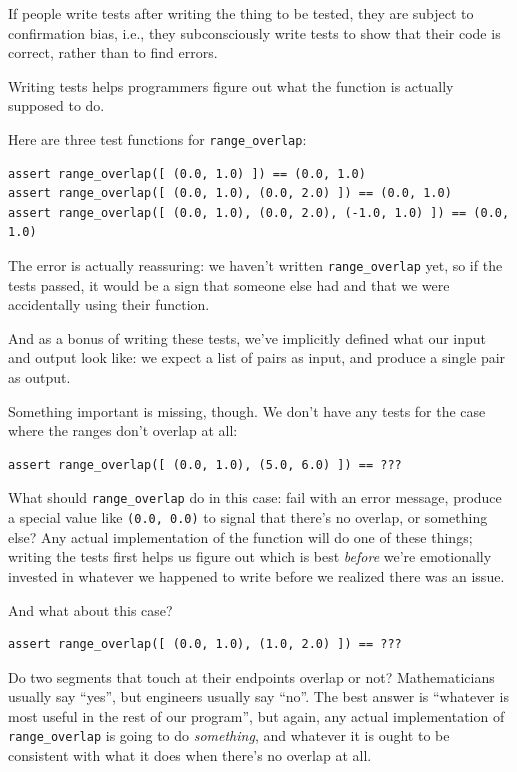 \documentclass{book}
\begin{document}
\begin{swcenumerate}
\item
  If people write tests after writing the thing to be tested, they are
  subject to confirmation bias, i.e., they subconsciously write tests to
  show that their code is correct, rather than to find errors.
\item
  Writing tests helps programmers figure out what the function is
  actually supposed to do.
\end{swcenumerate}

Here are three test functions for \texttt{range\_overlap}:

\begin{verbatim}
assert range_overlap([ (0.0, 1.0) ]) == (0.0, 1.0)
assert range_overlap([ (0.0, 1.0), (0.0, 2.0) ]) == (0.0, 1.0)
assert range_overlap([ (0.0, 1.0), (0.0, 2.0), (-1.0, 1.0) ]) == (0.0, 1.0)
\end{verbatim}

The error is actually reassuring: we haven't written
\texttt{range\_overlap} yet, so if the tests passed, it would be a sign
that someone else had and that we were accidentally using their
function.

And as a bonus of writing these tests, we've implicitly defined what our
input and output look like: we expect a list of pairs as input, and
produce a single pair as output.

Something important is missing, though. We don't have any tests for the
case where the ranges don't overlap at all:

\begin{verbatim}
assert range_overlap([ (0.0, 1.0), (5.0, 6.0) ]) == ???
\end{verbatim}

What should \texttt{range\_overlap} do in this case: fail with an error
message, produce a special value like \texttt{(0.0, 0.0)} to signal that
there's no overlap, or something else? Any actual implementation of the
function will do one of these things; writing the tests first helps us
figure out which is best \emph{before} we're emotionally invested in
whatever we happened to write before we realized there was an issue.

And what about this case?

\begin{verbatim}
assert range_overlap([ (0.0, 1.0), (1.0, 2.0) ]) == ???
\end{verbatim}

Do two segments that touch at their endpoints overlap or not?
Mathematicians usually say ``yes'', but engineers usually say ``no''.
The best answer is ``whatever is most useful in the rest of our
program'', but again, any actual implementation of
\texttt{range\_overlap} is going to do \emph{something}, and whatever it
is ought to be consistent with what it does when there's no overlap at
all.
\end{document}
